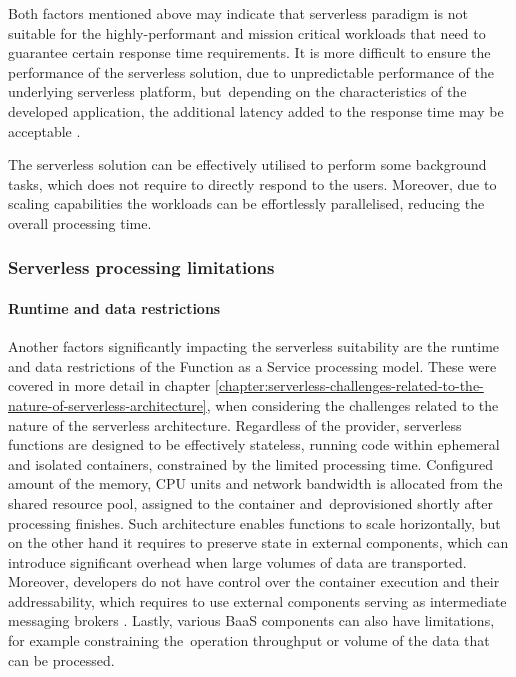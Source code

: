 Both factors mentioned above may indicate that serverless paradigm is not suitable for the highly-performant and mission critical workloads that need to guarantee certain response time requirements.
It is more difficult to ensure the performance of the serverless solution, due to unpredictable performance of the underlying serverless platform, but~depending on the characteristics of the developed application, the additional latency added to the response time may be acceptable \cite{LeveragingServerlessCloudComputingArchitectures}.

The serverless solution can be effectively utilised to perform some background tasks, which does not require to directly respond to the users. Moreover, due to scaling capabilities the workloads can be effortlessly parallelised, reducing the overall processing time.

\subsubsection{Serverless processing limitations}

\paragraph{Runtime and data restrictions} \label{chapter:serverless-processing-limitations-runtime-and-data-restrictions}

Another factors significantly impacting the serverless suitability are the runtime and data restrictions of the Function as a Service processing model. These were covered in more detail in chapter \ref{chapter:serverless-challenges-related-to-the-nature-of-serverless-architecture}, when considering the challenges related to the nature of the serverless architecture.
Regardless of the provider, serverless functions are designed to be effectively stateless, running code within ephemeral and isolated containers, constrained by the limited processing time. Configured amount of the memory, CPU units and network bandwidth is allocated from the shared resource pool, assigned to the container and~deprovisioned shortly after processing finishes.
Such architecture enables functions to scale horizontally, but on the other hand it requires to preserve state in external components, which can introduce significant overhead when large volumes of data are transported.
Moreover, developers do not have control over the container execution and their addressability, which requires to use external components serving as intermediate messaging brokers \cite{MartinFowlerServerless}. Lastly, various BaaS components can also have limitations, for example constraining the~operation throughput or volume of the data that can be processed.

